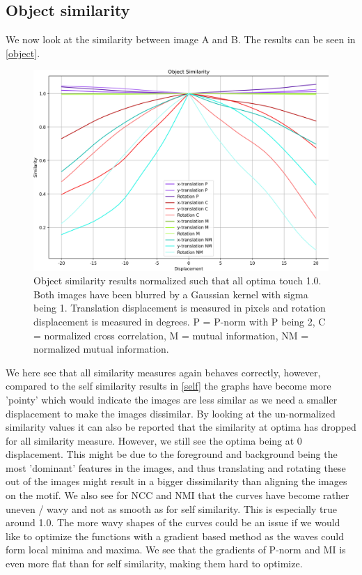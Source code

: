 \subsection{Object similarity}
We now look at the similarity between image A and B. The results can be seen in \autoref{object}.

\begin{figure}
	\centering
	\includegraphics[width=0.8\linewidth]{Materials/objectSimilarity}
	\caption{Object similarity results normalized such that all optima touch 1.0. Both images have been blurred by a Gaussian kernel with sigma being 1. Translation displacement is measured in pixels and rotation displacement is measured in degrees. P = P-norm with P being 2, C = normalized cross correlation, M = mutual information, NM = normalized mutual information.}
	\label{object}
\end{figure}
We here see that all similarity measures again behaves correctly, however, compared to the self similarity results in \autoref{self} the graphs have become more 'pointy' which would indicate the images are less similar as we need a smaller displacement to make the images dissimilar. By looking at the un-normalized similarity values it can also be reported that the similarity at optima has dropped for all similarity measure. However, we still see the optima being at 0 displacement. This might be due to the foreground and background being the most 'dominant' features in the images, and thus translating and rotating these out of the images might result in a bigger dissimilarity than aligning the images on the motif. We also see for NCC and NMI that the curves have become rather uneven / wavy and not as smooth as for self similarity. This is especially true around 1.0. The more wavy shapes of the curves could be an issue if we would like to optimize the functions with a gradient based method as the waves could form local minima and maxima. We see that the gradients of P-norm and MI is even more flat than for self similarity, making them hard to optimize. 